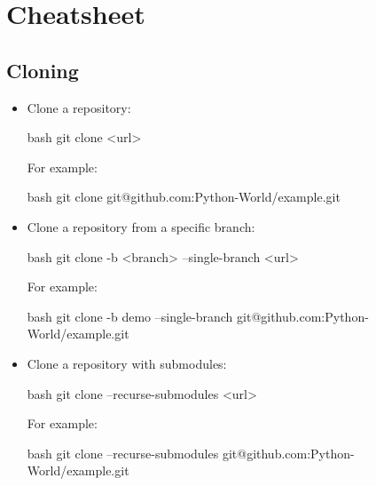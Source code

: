 \section{ Cheatsheet}


\subsection{Cloning}

\begin{itemize}
    \item Clone a repository:
    \begin{mintedbox}{bash}
git clone <url>
    \end{mintedbox}
    For example:
    \begin{mintedbox}{bash}
git clone git@github.com:Python-World/example.git
    \end{mintedbox}
    \item Clone a repository from a specific branch:
    \begin{mintedbox}{bash}
git clone -b <branch> --single-branch <url>
    \end{mintedbox}
    For example:
    \begin{mintedbox}{bash}
git clone -b demo --single-branch git@github.com:Python-World/example.git
    \end{mintedbox}
    \item Clone a repository with submodules:
    \begin{mintedbox}{bash}
git clone --recurse-submodules <url>
    \end{mintedbox}
    For example:
    \begin{mintedbox}{bash}
git clone --recurse-submodules git@github.com:Python-World/example.git
    \end{mintedbox}
\end{itemize}


